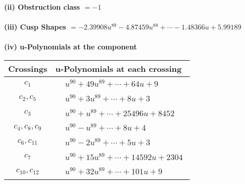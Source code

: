 \documentclass[1p]{elsarticle_modified}
\theoremstyle{definition}
\begin{document}
\flushleft \textbf{(ii) Obstruction class $= -1$}\\~\\
\flushleft \textbf{(iii) Cusp Shapes $= -2.39908 u^{89}-4.87459 u^{88}+\cdots-1.48366 u+5.99189$}\\~\\
\newpage\renewcommand{\arraystretch}{1}
\flushleft \textbf{(iv) u-Polynomials at the component}\newline \\
\begin{tabular}{m{50pt}|m{274pt}}
Crossings & \hspace{64pt}u-Polynomials at each crossing \\
\hline $$\begin{aligned}c_{1}\end{aligned}$$&$\begin{aligned}
&u^{90}+49 u^{89}+\cdots+64 u+9
\end{aligned}$\\
\hline $$\begin{aligned}c_{2},c_{5}\end{aligned}$$&$\begin{aligned}
&u^{90}+3 u^{89}+\cdots+8 u+3
\end{aligned}$\\
\hline $$\begin{aligned}c_{3}\end{aligned}$$&$\begin{aligned}
&u^{90}+u^{89}+\cdots+25496 u+8452
\end{aligned}$\\
\hline $$\begin{aligned}c_{4},c_{8},c_{9}\end{aligned}$$&$\begin{aligned}
&u^{90}- u^{89}+\cdots+8 u+4
\end{aligned}$\\
\hline $$\begin{aligned}c_{6},c_{11}\end{aligned}$$&$\begin{aligned}
&u^{90}-2 u^{89}+\cdots+5 u+3
\end{aligned}$\\
\hline $$\begin{aligned}c_{7}\end{aligned}$$&$\begin{aligned}
&u^{90}+15 u^{89}+\cdots+14592 u+2304
\end{aligned}$\\
\hline $$\begin{aligned}c_{10},c_{12}\end{aligned}$$&$\begin{aligned}
&u^{90}+32 u^{89}+\cdots+101 u+9
\end{aligned}$\\
\hline
\end{tabular}\\~\\
\end{document}

